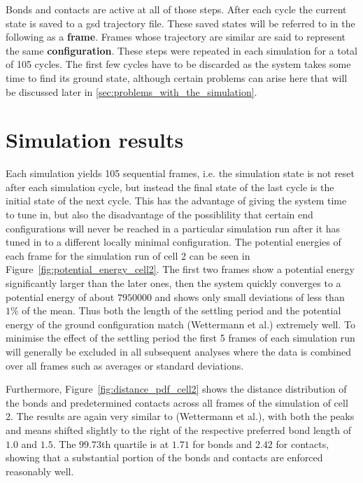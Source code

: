 Bonds and contacts are active at all of those steps. After each cycle the current state is saved to a gsd trajectory file. These saved states will be referred to in the following as a \textbf{frame}. Frames whose trajectory are similar are said to represent the same \textbf{configuration}. These steps were repeated in each simulation for a total of 105 cycles. The first few cycles have to be discarded as the system takes some time to find its ground state, although certain problems can arise here that will be discussed later in \ref{sec:problems_with_the_simulation}.


\section{Simulation results} %
\label{sec:simulation_results}

Each simulation yields 105 sequential frames, i.e. the simulation state is not reset after each simulation cycle, but instead the final state of the last cycle is the initial state of the next cycle. This has the advantage of giving the system time to tune in, but also the disadvantage of the possiblility that certain end configurations will never be reached in a particular simulation run after it has tuned in to a different locally minimal configuration. The potential energies of each frame for the simulation run of cell 2 can be seen in Figure~\ref{fig:potential_energy_cell2}. The first two frames show a potential energy significantly larger than the later ones, then the system quickly converges to a potential energy of about \(\num{7950000}\) and shows only small deviations of less than \(1 \%\) of the mean. Thus both the length of the settling period and the potential energy of the ground configuration match (Wettermann et al.\cite{wettermann_minimal_2020}) extremely well. To minimise the effect of the settling period the first 5 frames of each simulation run will generally be excluded in all subsequent analyses where the data is combined over all frames such as averages or standard deviations.

Furthermore, Figure~\ref{fig:distance_pdf_cell2} shows the distance distribution of the bonds and predetermined contacts across all frames of the simulation of cell 2. The results are again very similar to (Wettermann et al.\cite{wettermann_minimal_2020}), with both the peaks and means shifted slightly to the right of the respective preferred bond length of \(1.0\) and \(1.5\). The \(99.73\)th quartile is at \(1.71\) for bonds and \(2.42\) for contacts, showing that a substantial portion of the bonds and contacts are enforced reasonably well.

